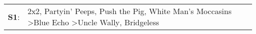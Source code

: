\begin{supertabular}{p{0.03\textwidth}p{0.92\textwidth}}
 \textbf{S1}:  &  2x2\textsuperscript{}, \enspace Partyin' Peeps\textsuperscript{}, \enspace Push the Pig\textsuperscript{}, \enspace White Man's Moccasins\textsuperscript{} \textgreater \enspace Blue Echo\textsuperscript{} \textgreater \enspace Uncle Wally\textsuperscript{}, \enspace Bridgeless\textsuperscript{}  \enspace  \\
\end{supertabular}
